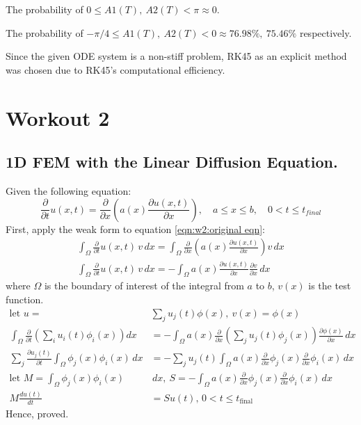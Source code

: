 \documentclass{article}
\begin{document}
The probability of $0 \le A1(T),\ A2(T) < \pi \approx 0$. 

The probability of $-\pi/4 \le A1(T),\ A2(T) < 0 \approx 76.98\%,\ 75.46\%$ respectively. 

Since the given ODE system is a non-stiff problem, RK45 as an explicit method was chosen due to RK45's computational efficiency.


\section{Workout 2}%
\label{sec:Workout 2}
\subsection{1D FEM with the Linear Diffusion Equation.}%
\label{sub:1D FEM with the Linear Diffusion Equation.}
Given the following equation:
\begin{equation}
  \frac{\partial}{\partial t} u(x,t) = \frac{\partial}{\partial x} \left( a(x) \frac{\partial u(x,t)}{\partial x} \right), \quad a \leq x \leq b, \quad 0 < t \leq t_{final} \label{eqn:w2:original eqn}
\end{equation}
First, apply the weak form to equation \ref{eqn:w2:original eqn}:
\begin{align}
  \int_{\Omega} \frac{\partial}{\partial t} u(x,t) \, v \, dx = \int_{\Omega} \frac{\partial}{\partial x} \left( a(x) \frac{\partial u(x,t)}{\partial x} \right) v \, dx \\
  \int_{\Omega} \frac{\partial}{\partial t} u(x,t) \, v \, dx = - \int_{\Omega}  a(x) \frac{\partial u(x,t)}{\partial x} \frac{\partial v}{\partial x} \, dx
\end{align}
where $\Omega$ is the boundary of interest of the integral from $a$ to $b$, $v(x)$ is the test function.
\begin{align}
  \text{let } u = & \sum_j u_j (t) \phi(x) ,\ v(x) = \phi(x) \\
  \int_{\Omega} \frac{\partial}{\partial t} \left( \sum_{i} u_{i}(t) \phi_{i}(x) \right) dx &= -\int_{\Omega} a(x) \frac{\partial}{\partial x} \left( \sum_{j} u_{j}(t) \phi_{j}(x) \right) \frac{\partial \phi(x)}{\partial x} \, dx \\
  \sum_j \frac{\partial u_j(t)}{\partial t} \int_{\Omega} \phi_j(x) \phi_i(x) \, dx &= - \sum_j u_j(t) \int_{\Omega} a(x) \frac{\partial}{\partial x} \phi_j(x) \frac{\partial}{\partial x} \phi_i(x) \, dx \\
  \text{let } M = \int_{\Omega} \phi_j(x) \phi_i(x)& \, dx ,\ S = -\int_{\Omega} a(x) \frac{\partial}{\partial x} \phi_j(x) \frac{\partial}{\partial x} \phi_i(x) \, dx \\
  M \frac{d {u(t)}}{d {t}} &= S u(t), \, 0 < t \le t_{\text{final}} \label{eqn:w2:derived 1}
\end{align}
Hence, proved.
\end{document}
